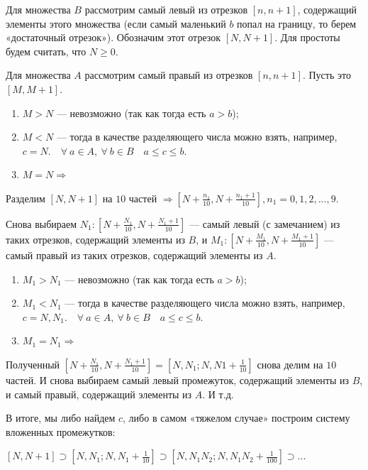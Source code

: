 \documentclass{article}
\begin{document}
        Для множества $B$ рассмотрим самый левый из отрезков $[n,n+1]$, содержащий элементы этого множества (если самый маленький $b$ попал на границу, то берем «достаточный отрезок»). Обозначим этот отрезок $[N,N+1]$. Для простоты будем считать, что $N \geq 0$.
        
        Для множества $A$ рассмотрим самый правый из отрезков $[n,n+1]$. Пусть это $[M,M+1]$. 

        \begin{enumerate}
            \item $M > N$ --- невозможно (так как тогда есть $a > b$);
            \item $M < N$ --- тогда в качестве разделяющего числа можно взять, например, $c = N.\quad \forall\ a \in A,\ \forall\ b \in B \quad a \leq c \leq b$.
            \item $M = N \Rightarrow$ 
        \end{enumerate}

        Разделим $[N,N+1]$ на $10$ частей $\Rightarrow [N + \frac{n_1}{10},N + \frac{n_1 + 1}{10}], n_1 = 0,1,2,...,9$.

        Снова выбираем $N_1: [N + \frac{N_1}{10},N + \frac{N_1 + 1}{10}]$ --- самый левый (с замечанием) из таких отрезков, содержащий элементы из $B$, и $M_1: [N + \frac{M_1}{10},N + \frac{M_1 + 1}{10}]$ --- самый правый из таких отрезков, содержащий элементы из $A$. 

        \begin{enumerate}
            \item $M_1 > N_1$ --- невозможно (так как тогда есть $a > b$);
            \item $M_1 < N_1$ --- тогда в качестве разделяющего числа можно взять, например, $c = N,N_1.\quad \forall\ a \in A,\ \forall\ b \in B \quad a \leq c \leq b$.
            \item $M_1 = N_1 \Rightarrow$ 
        \end{enumerate}

        Полученный $[N + \frac{N_1}{10},N + \frac{N_1 + 1}{10}] = [N,N_1; N,N1+\frac{1}{10}]$ снова делим на $10$ частей. И снова выбираем самый левый промежуток, содержащий элементы из $B$, и самый правый, содержащий элементы из $A$. И т.д.

        В итоге, мы либо найдем $c$, либо в самом «тяжелом случае» построим систему вложенных промежутков: 

        $[N,N + 1] \supset [N,N_1; N,N_1 + \frac{1}{10}] \supset [N,N_1N_2; N,N_1N_2 + \frac{1}{100}] \supset ...$
\end{document}
